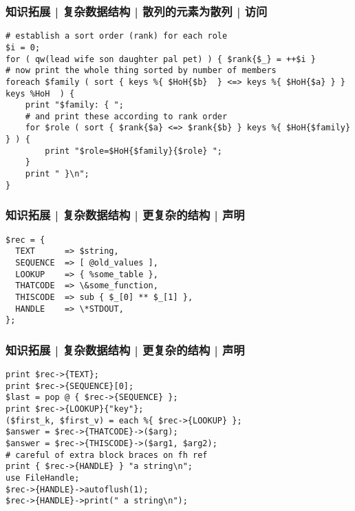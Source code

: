 \begin{frame}[fragile]
  \frametitle{知识拓展 | 复杂数据结构 | 散列的元素为散列 | 访问}
  \vspace{-0.8em}
\begin{lstlisting}
# establish a sort order (rank) for each role
$i = 0;
for ( qw(lead wife son daughter pal pet) ) { $rank{$_} = ++$i }
# now print the whole thing sorted by number of members
foreach $family ( sort { keys %{ $HoH{$b}  } <=> keys %{ $HoH{$a} } } keys %HoH  ) {
    print "$family: { ";
    # and print these according to rank order
    for $role ( sort { $rank{$a} <=> $rank{$b} } keys %{ $HoH{$family} } ) {
        print "$role=$HoH{$family}{$role} ";
    }
    print " }\n";
}
\end{lstlisting}
\end{frame}

\begin{frame}[fragile]
  \frametitle{知识拓展 | 复杂数据结构 | 更复杂的结构 | 声明}
\begin{lstlisting}
$rec = {
  TEXT      => $string,
  SEQUENCE  => [ @old_values ],
  LOOKUP    => { %some_table },
  THATCODE  => \&some_function,
  THISCODE  => sub { $_[0] ** $_[1] },
  HANDLE    => \*STDOUT,
};
\end{lstlisting}
\end{frame}

\begin{frame}[fragile]
  \frametitle{知识拓展 | 复杂数据结构 | 更复杂的结构 | 声明}
\begin{lstlisting}
print $rec->{TEXT};
print $rec->{SEQUENCE}[0];
$last = pop @ { $rec->{SEQUENCE} };
print $rec->{LOOKUP}{"key"};
($first_k, $first_v) = each %{ $rec->{LOOKUP} };
$answer = $rec->{THATCODE}->($arg);
$answer = $rec->{THISCODE}->($arg1, $arg2);
# careful of extra block braces on fh ref
print { $rec->{HANDLE} } "a string\n";
use FileHandle;
$rec->{HANDLE}->autoflush(1);
$rec->{HANDLE}->print(" a string\n");
\end{lstlisting}
\end{frame}

